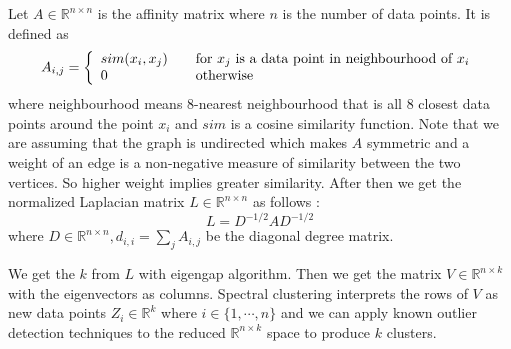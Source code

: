Let $A \in \mathbb{R}^{n \times n}$ is the affinity matrix where $n$ is the number of data points. It is defined as 
\begin{equation}
A_{i,j} = \left\{ 
  \begin{array}{l l}
    sim(x_i, x_j) & \quad \text{for $x_j$ is a data point in neighbourhood of $x_i$}\\
    0 & \quad \text{otherwise}
  \end{array} \right.
\end{equation}
where neighbourhood means 8-nearest neighbourhood that is all 8 closest data points around the point $x_i$
and $sim$ is a cosine similarity function. 
Note that we are assuming that the graph is undirected which makes $A$ symmetric and a weight of an edge is a non-negative measure of similarity between the two vertices. 
So higher weight implies greater similarity. 
After then we get the normalized Laplacian matrix $L \in \mathbb{R}^{n \times n}$ as follows : 
\begin{equation}
L = D^{-1/2} A D^{-1/2}
\end{equation}
where $D \in \mathbb{R}^{n \times n}, d_{i,i} = \sum_{j} A_{i,j}$ be the diagonal degree matrix. 

We get the $k$ from $L$ with eigengap algorithm. 
Then we get the matrix $V \in \mathbb{R}^{n \times k}$ with the eigenvectors as columns.
Spectral clustering interprets the rows of $V$ as new data points $Z_i \in \mathbb{R}^k$ where $i \in \{1, \cdots, n\}$ 
and we can apply known outlier detection techniques \cite{knorr00} to the reduced $\mathbb{R}^{n \times k}$ space to produce $k$ clusters. 

